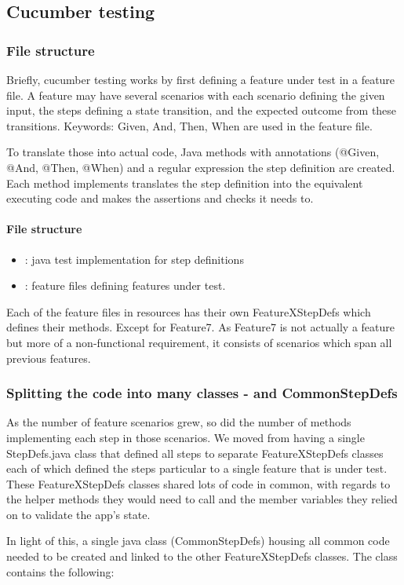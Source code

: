 \subsection{Cucumber testing}
\subsubsection{File structure}

Briefly, cucumber testing works by first defining a feature under test in a feature file. A feature may have several scenarios with each scenario defining the given input, the steps defining a state transition, and the expected outcome from these transitions. Keywords: Given, And, Then, When are used in the feature file. 
\par
To translate those into actual code, Java methods with annotations (@Given, @And, @Then, @When) and a regular expression the step definition are created. Each method implements translates the step definition into the equivalent executing code and makes the assertions and checks it needs to. 
\par
\paragraph{File structure}
\begin{itemize}
    \item {}: java test implementation for step definitions 
    \item {}: feature files defining features under test. 
\end{itemize}

Each of the feature files in resources has their own FeatureXStepDefs which defines their methods. Except for Feature7. As Feature7 is not actually a feature but more of a non-functional requirement, it consists of scenarios which span all previous features. 

\subsubsection{Splitting the code into many classes - and CommonStepDefs}
As the number of feature scenarios grew, so did the number of methods implementing each step in those scenarios. 
We moved from having a single StepDefs.java class that defined all steps to separate FeatureXStepDefs classes each of which defined the steps particular to a single feature that is under test.
These FeatureXStepDefs classes shared lots of code in common, with regards to the helper methods they would need to call and the member variables they relied on to validate the app's state. 
\par
In light of this, a single java class (CommonStepDefs) housing all common code needed to be created and linked to the other FeatureXStepDefs classes. The class contains the following: 

